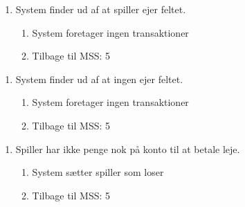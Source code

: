 \begin{enumerate}[2a]
\item System finder ud af at spiller ejer feltet.
	\begin{enumerate}[1.]
	\item System foretager ingen transaktioner
	\item Tilbage til MSS: 5
	\end{enumerate}
\end{enumerate} 

\begin{enumerate}[3a]
\item System finder ud af at ingen ejer feltet.
	\begin{enumerate}[1.]
	\item System foretager ingen transaktioner
	\item Tilbage til MSS: 5
	\end{enumerate}
\end{enumerate} 
 
\begin{enumerate}[4a]
\item Spiller har ikke penge nok på konto til at betale leje.
	\begin{enumerate}[1.]
	\item System sætter spiller som loser
	\item Tilbage til MSS: 5
	\end{enumerate}
\end{enumerate} 


 
 
 
 








